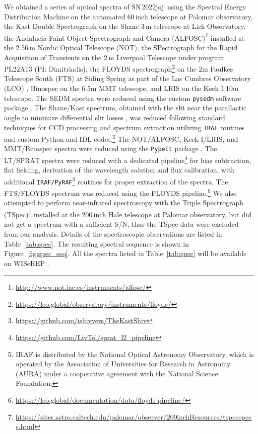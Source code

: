 \documentclass[twocolumn]{aastex631}
\newcommand{\sn}{SN\,2022joj}
\begin{document}
\begin{CJK*}{UTF8}{gbsn}
We obtained a series of optical spectra of \sn\ using 
the Spectral Energy Distribution Machine \citep[SEDM;][]{SEDM_2018} on the automated 60\,inch telescope \citep[P60;][]{P60_2006} at Palomar observatory, 
the Kast Double Spectrograph \citep{miller1994kast} on the Shane 3\,m telescope at Lick Observatory, 
the Andalucia Faint Object Spectrograph and Camera (ALFOSC)\footnote{\url{http://www.not.iac.es/instruments/alfosc/}} installed at the 2.56\,m Nordic Optical Telescope (NOT), 
the SPectrograph for the Rapid Acquisition of Transients \citep[SPRAT;][]{SPRAT_2014} on the 2\,m Liverpool Telescope \citep[LT;][]{LT_2004} under program PL22A13 (PI: Dimitriadis), 
the FLOYDS spectrograph\footnote{\url{https://lco.global/observatory/instruments/floyds/}} on the 2m Faulkes Telescope South (FTS) at Siding Spring as part of the Las Cumbres Observatory (LCO) \citep{LCOGT_2013},
Binospec on the 6.5m MMT telescope, 
and LRIS on the Keck I 10m telescope. 
The SEDM spectra were reduced using the custom \texttt{pysedm} software package \citep{Rigault_pysedm_2019}. 
The Shane/Kast spectrum, obtained with the slit near the parallactic angle to minimize differential slit losses \citep{Shane_1982}, was reduced following standard techniques for CCD processing and spectrum extraction \citep{Silverman_UCBIa_2012} utilizing \texttt{IRAF} \citep{IRAF_1986} routines and custom Python and IDL codes.\footnote{\url{https://github.com/ishivvers/TheKastShiv}} 
The NOT/ALFOSC, Keck I/LRIS, and MMT/Binospec spectra were reduced using the \texttt{PypeIt} package \citep{pypeit:joss_pub}. 
The LT/SPRAT spectra were reduced with a dedicated pipeline\footnote{\url{https://github.com/LivTel/sprat\_l2\_pipeline}} for bias subtraction, flat fielding, derivation of the wavelength solution and flux calibration, with additional \texttt{IRAF/PyRAF}\footnote{IRAF is distributed by the National Optical Astronomy Observatory, which is operated by the Association of Universities for Research in Astronomy (AURA) under a cooperative agreement with the National Science Foundation.} routines for proper extraction of the spectra. 
The FTS/FLOYDS spectrum was reduced using the FLOYDS pipeline.\footnote{\url{https://lco.global/documentation/data/floyds-pipeline/}} 
We also attempted to perform near-infrared spectroscopy with the Triple Spectrograph (TSpec)\footnote{\url{https://sites.astro.caltech.edu/palomar/observer/200inchResources/tspecspecs.html}} installed at the 200\,inch Hale telescope \citep[P200;][]{P200_1982} at Palomar observatory, but did not get a spectrum with a sufficient S/N, thus the TSpec data were excluded from our analysis.
Details of the spectroscopic observations are listed in Table~\ref{tab:spec}. The resulting spectral sequence is shown in Figure~\ref{fig:spec_seq}. All the spectra listed in Table~\ref{tab:spec} will be available on WISeREP \citep{wiserep_2012}.


\end{CJK*}
\end{document}
